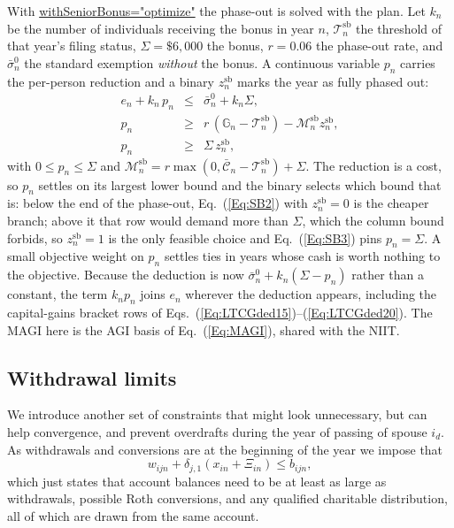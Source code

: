 \documentclass[fleqn,12pt]{report}
\newcommand{\code}[1]{\url{#1}}
\begin{document}
	With \code{withSeniorBonus="optimize"} the phase-out is solved with the plan.
	Let $k_n$ be the number of individuals receiving the bonus in year $n$,
	$\mathcal{T}^{\mathrm{sb}}_n$ the threshold of that year's filing status,
	$\Sigma = \$6{,}000$ the bonus, $r = 0.06$ the phase-out rate, and
	$\bar{\sigma}^{0}_n$ the standard exemption \emph{without} the bonus.
	A continuous variable $p_n$ carries the per-person reduction and a binary
	$z^{\mathrm{sb}}_n$ marks the year as fully phased out:
	\begin{eqnarray}
		e_n + k_n\,p_n &\le& \bar{\sigma}^{0}_n + k_n \Sigma, \label{Eq:SB1} \\
		p_n &\ge& r\,(\mathbb{G}_n - \mathcal{T}^{\mathrm{sb}}_n)
			- \mathcal{M}^{\mathrm{sb}}_n z^{\mathrm{sb}}_n, \label{Eq:SB2} \\
		p_n &\ge& \Sigma\, z^{\mathrm{sb}}_n, \label{Eq:SB3}
	\end{eqnarray}
	with $0 \le p_n \le \Sigma$ and
	$\mathcal{M}^{\mathrm{sb}}_n = r\max(0, \bar{\mathcal{C}}_n -
	\mathcal{T}^{\mathrm{sb}}_n) + \Sigma$.
	The reduction is a cost, so $p_n$ settles on its largest lower bound and the
	binary selects which bound that is: below the end of the phase-out,
	Eq.~(\ref{Eq:SB2}) with $z^{\mathrm{sb}}_n = 0$ is the cheaper branch; above it
	that row would demand more than $\Sigma$, which the column bound forbids, so
	$z^{\mathrm{sb}}_n = 1$ is the only feasible choice and Eq.~(\ref{Eq:SB3}) pins
	$p_n = \Sigma$.
	A small objective weight on $p_n$ settles ties in years whose cash is worth
	nothing to the objective.
	Because the deduction is now $\bar{\sigma}^{0}_n + k_n(\Sigma - p_n)$ rather than
	a constant, the term $k_n p_n$ joins $e_n$ wherever the deduction appears,
	including the capital-gains bracket rows of
	Eqs.~(\ref{Eq:LTCGded15})--(\ref{Eq:LTCGded20}).
	The MAGI here is the AGI basis of Eq.~(\ref{Eq:MAGI}), shared with the NIIT.

\subsection{Withdrawal limits}
\label{Sec:WithdrawalLimits}
	We introduce another set of constraints that might look unnecessary, but can help
	convergence, and prevent overdrafts during the year of passing of spouse $i_d$.
	As withdrawals and conversions are at the beginning of the year 
	we impose that
	\begin{equation}
		w_{ijn} + \delta_{j, 1} \left( x_{in} + \Xi_{in} \right) \le b_{ijn},
	\end{equation}
	which just states that account balances need to be at least as large as withdrawals,
	possible Roth conversions, and any qualified charitable distribution, all of which
	are drawn from the same account.
\end{document}

